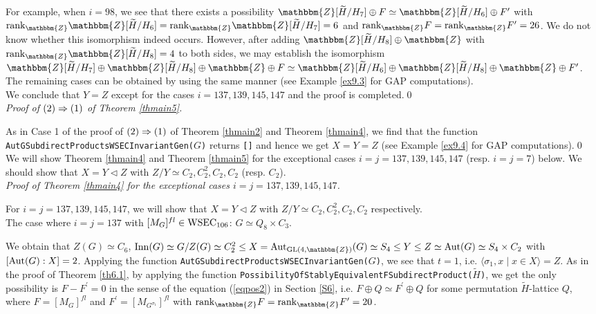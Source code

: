 \documentclass{amsart}
\theoremstyle{plain}
\theoremstyle{definition}
\theoremstyle{remark}
\newcommand{\bZ}{\mathbbm{Z}}\newcommand{\bQ}{\mathbbm{Q}}
\newcommand{\GL}{{\rm GL}}\newcommand{\SL}{{\rm SL}}
\begin{document}
For example, when $i=98$, 
we see that there exists a possibility 
$\bZ[\widetilde{H}/H_7]\oplus F\simeq \bZ[\widetilde{H}/H_6]\oplus F^\prime$ 
with ${\rm rank}_\bZ \bZ[\widetilde{H}/H_6]={\rm rank}_\bZ \bZ[\widetilde{H}/H_7]=6$ and ${\rm rank}_\bZ F={\rm rank}_\bZ F^\prime=26$. 
We do not know whether this isomorphism indeed occurs. 
However, after adding $\bZ[\widetilde{H}/H_8]\oplus\bZ$ with 
${\rm rank}_\bZ \bZ[\widetilde{H}/H_8]=4$ to both sides, 
we may establish the isomorphism 
$\bZ[\widetilde{H}/H_7]\oplus\bZ[\widetilde{H}/H_8]\oplus\bZ\oplus F
\simeq 
\bZ[\widetilde{H}/H_6]\oplus\bZ[\widetilde{H}/H_8]\oplus\bZ\oplus F^\prime$. 
The remaining cases can be obtained by using the same manner 
(see Example \ref{ex9.3} for GAP computations).\\

We conclude that $Y=Z$ except for the cases $i=137,139,145,147$ 
and the proof is completed.\qed\\

{\it Proof of ${\rm (2)}\Rightarrow {\rm (1)}$ of {Theorem \ref{thmain5}}.}

As in Case 1 of the proof of ${\rm (2)}\Rightarrow {\rm (1)}$ of 
{Theorem \ref{thmain2}} and {Theorem \ref{thmain4}}, 
we find that 
the function\\ {\tt AutGSubdirectProductsWSECInvariantGen(}$G${\tt)} 
returns {\tt []} and hence we get $X=Y=Z$ 
(see Example \ref{ex9.4} for GAP computations).\qed\\

We will show {Theorem \ref{thmain4}} and {Theorem \ref{thmain5}} 
for the exceptional cases $i=j=137,139,145,147$ (resp. $i=j=7$) below. 
We should show that 
$X=Y\lhd Z$ with $Z/Y\simeq C_2,C_2^2,C_2,C_2$ (resp. $C_2$).\\

{\it Proof of {Theorem \ref{thmain4}} for the exceptional cases $i=j=137,139,145,147$.} 

For $i=j=137,139,145,147$, we will show that 
$X=Y\lhd Z$ with $Z/Y\simeq C_2,C_2^2,C_2,C_2$ respectively.\\

The case where  $i=j=137$ with $[M_G]^{fl}\in {\rm WSEC}_{106}$: $G\simeq Q_8\times C_3$.

We obtain that $Z(G)\simeq C_6$, 
${\rm Inn}(G)\simeq G/Z(G)\simeq C_2^2\leq 
X={\rm Aut}_{\GL(4,\bZ)}(G)\simeq S_4\leq 
Y\leq Z\simeq {\rm Aut}(G)\simeq S_4\times C_2$ 
with $[{\rm Aut}(G):X]=2$. 
Applying the function 
{\tt AutGSubdirectProductsWSECInvariantGen(}$G${\tt)}, 
we see that $t=1$, 
i.e. $\langle \sigma_1,x\mid x\in X\rangle=Z$. 
As in the proof of Theorem \ref{th6.1}, by applying the function 
{\tt PossibilityOfStablyEquivalentFSubdirectProduct($\widetilde{H}$)}, 
we get the only possibility is $F-F^\prime=0$ 
in the sense of the equation (\ref{eqpos2}) in Section \ref{S6}, 
i.e. $F\oplus Q\simeq F^\prime\oplus Q$ for some permutation 
$\widetilde{H}$-lattice $Q$, 
where $F=[M_G]^{fl}$ and $F^\prime=[M_{G^{\sigma_1}}]^{fl}$ 
with ${\rm rank}_\bZ F={\rm rank}_\bZ F^\prime=20$. 
\end{document}
